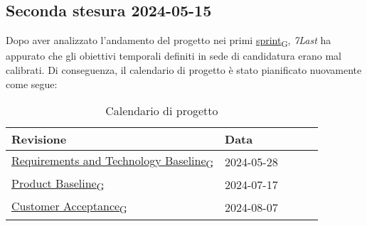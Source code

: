 \subsection{Seconda stesura 2024-05-15}
Dopo aver analizzato l'andamento del progetto nei primi \href{https://7last.github.io/docs/pb/documentazione-interna/glossario\#sprint}{sprint\textsubscript{G}}, \textit{7Last} ha appurato che gli obiettivi temporali definiti in sede di candidatura erano mal calibrati. Di conseguenza, il calendario di progetto è stato pianificato nuovamente come segue:
\begin{table}[!h]
    \begin{center}
        \begin{tabular}{ | l | l | l | l | l | }
            \hline
            Revisione                               & Data       \\ \hline
            \href{https://7last.github.io/docs/pb/documentazione-interna/glossario\#requirements-and-technology-baseline}{Requirements and Technology Baseline\textsubscript{G}}    & 2024-05-28 \\
            \href{https://7last.github.io/docs/pb/documentazione-interna/glossario\#product-baseline}{Product Baseline\textsubscript{G}}                        & 2024-07-17 \\
            \href{https://7last.github.io/docs/pb/documentazione-interna/glossario\#customer-acceptance}{Customer Acceptance\textsubscript{G}}                     & 2024-08-07 \\
            \hline
        \end{tabular}
    \end{center}
    \caption{Calendario di progetto}
\end{table}